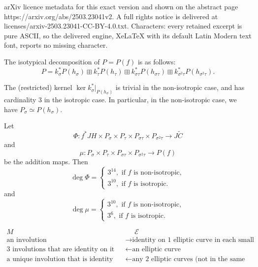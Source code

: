 \documentclass[10pt,a4paper]{amsart}
\newcommand{\cE}{\mathcal{E}}
\newcommand{\s}{\sigma}
\newcommand{\tC}{\widetilde{C}}
\begin{document}
arXiv licence metadata for this exact version and shown on the abstract page https://arxiv.org/abs/2503.23041v2. A full rights notice is delivered at licenses/arxiv-2503.23041-CC-BY-4.0.txt. Characters: every retained excerpt is pure ASCII, so the delivered engine, XeLaTeX with its default Latin Modern text font, reports no missing character.
\begin{cor}
\label{decprym}
    The isotypical decomposition of $P=P(f)$ is as follows:
    $$P = k_{\sigma}^*P(h_{\sigma}) \boxplus k_{\tau}^*P(h_{\tau}) \boxplus k_{\sigma\tau}^*P(h_{\sigma\tau}) \boxplus  k_{\sigma^2\tau}^*P(h_{\sigma^2\tau}).$$
\end{cor}

\begin{lem}\label{trivialkernel}
\label{kernel}
    The (restricted) kernel $\ker k_{\sigma}^*|_{P(h_{\sigma})}$ is trivial in the non-isotropic case, and has cardinality $3$ in the isotropic case. In particular, in the non-isotropic case, we have $P_\s\simeq P(h_{\sigma})$.
\end{lem}

\begin{lem}
\label{degree}
     Let $$\Phi: f^*JH \times P_{\s} \times P_{\tau} \times P_{\s\tau} \times P_{\s^2\tau} \to J\tC$$ and $$\mu: P_{\s} \times P_{\tau} \times P_{\s\tau} \times P_{\s^2\tau} \to P(f)$$ be the addition maps. Then $$\deg \Phi = \begin{cases}
         3^{14}, \text{ if $f$ is non-isotropic}, \\
         3^{10}, \text{ if $f$ is isotropic.}
     \end{cases}$$ and $$\deg \mu = \begin{cases}
         3^{10}, \text{ if $f$ is non-isotropic}, \\
         3^{6}, \text{ if $f$ is isotropic.}
     \end{cases}$$
\end{lem}

\begin{correspondence}
\label{correspondence}
\begin{align*}
    M &\ \ \ \ \ \ \cE\\
    \text{an involution} &\longrightarrow \text{identity on 1 elliptic curve in each small Prym}\\
    \text{3 involutions that are identity on it} &\longleftarrow \text{an elliptic curve}\\
    \text{a unique involution that is identity on them} &\longleftarrow \text{any 2 elliptic curves (not in the same triple)}
    \end{align*}
\end{correspondence}
\end{document}
